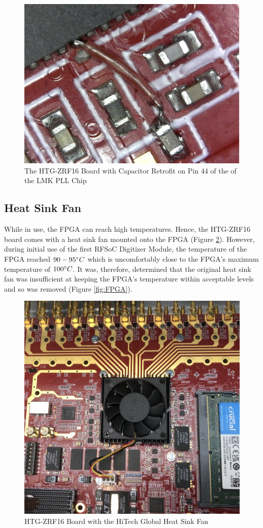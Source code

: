\documentclass[12pt,a4paper,oneside]{article}
\begin{document}
%
\begin{figure}[H]
\centering
\includegraphics[width=1\linewidth]{figures/Digitizer_retrofit.jpeg}
\caption{The HTG-ZRF16 Board with Capacitor Retrofit on Pin 44 of the of the LMK PLL Chip}
\label{fig:Digitizer_retrofit}
\end{figure}
%

\subsection{Heat Sink Fan}
\label{sec:3.1}

While in use, the FPGA can reach high temperatures. Hence, the HTG-ZRF16 board comes with a heat sink fan mounted onto the FPGA (Figure \ref{fig:Old_heatsink_fan}). However, during initial use of the first RFSoC Digitizer Module, the temperature of the FPGA reached $90-95\degree C$ which is uncomfortably close to the FPGA's maximum temperature of $100\degree C$. It was, therefore, determined that the original heat sink fan was insufficient at keeping  the FPGA's temperature within acceptable levels and so was removed (Figure \ref{fig:FPGA}).

%
\begin{figure}[H]
\centering
\includegraphics[width=.67\linewidth]{figures/Old_heatsink_fan.jpeg}
\caption{HTG-ZRF16 Board with the HiTech Global Heat Sink Fan}
\label{fig:Old_heatsink_fan}
\end{figure}
%
\end{document}
